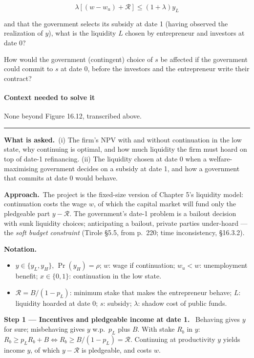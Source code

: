 \documentclass[11pt,a4paper]{article}
\newcommand{\notation}{\par\noindent\textbf{Notation.}}
\newcommand{\step}[2]{\par\medskip\noindent\textbf{Step #1 --- #2.}~}
\newcommand{\asked}{\par\medskip\noindent\textbf{What is asked.}~}
\newcommand{\approach}{\par\smallskip\noindent\textbf{Approach.}~}
\newcommand{\Rc}{\mathcal{R}}
\newcommand{\stmtend}{\par\endgroup\nopagebreak\noindent\rule{\linewidth}{0.4pt}\par\medskip}
\begin{document}
\[\lambda[(w - w_u) + \mathcal{R}] \leqslant (1 + \lambda)y_L\]

and that the government selects its subsidy at date 1 (having observed the realization of \(y\)),
what is the liquidity \(L\) chosen by entrepreneur and investors at date 0?

How would the government (contingent) choice of \(s\) be affected if the government could commit to
\(s\) at date 0, before the investors and the entrepreneur write their contract?

\paragraph{Context needed to solve it}

None beyond Figure 16.12, transcribed above.
\stmtend

\asked (i) The firm's NPV with and without continuation in the low state, why continuing is optimal, and how much liquidity the firm must hoard on top of date-1 refinancing. (ii) The liquidity chosen at date 0 when a welfare-maximising government decides on a subsidy at date 1, and how a government that commits at date 0 would behave.

\approach The project is the fixed-size version of Chapter 5's liquidity model: continuation costs the wage $w$, of which the capital market will fund only the pledgeable part $y-\Rc$. The government's date-1 problem is a bailout decision with sunk liquidity choices; anticipating a bailout, private parties under-hoard --- the \emph{soft budget constraint} (Tirole \S5.5, from p.~220; time inconsistency, \S16.3.2).

\notation
\begin{itemize}
  \item $y\in\{y_L,y_H\}$, $\Pr(y_H)=\rho$; $w$: wage if continuation; $w_u<w$: unemployment benefit; $x\in\{0,1\}$: continuation in the low state.
  \item $\Rc=B/(1-p_L)$: minimum stake that makes the entrepreneur behave; $L$: liquidity hoarded at date 0; $s$: subsidy; $\lambda$: shadow cost of public funds.
\end{itemize}

\step{1}{Incentives and pledgeable income at date 1} Behaving gives $y$ for sure; misbehaving gives $y$ w.p.\ $p_L$ plus $B$. With stake $R_b$ in $y$: $R_b\geq p_LR_b+B\iff R_b\geq B/(1-p_L)=\Rc$. Continuing at productivity $y$ yields income $y$, of which $y-\Rc$ is pledgeable, and costs $w$.
\end{document}
